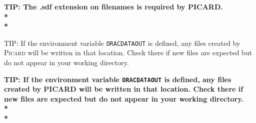 \documentclass[twoside,11pt]{article}
\newenvironment{latexonly}{}{}
\renewcommand{\_}{\texttt{\symbol{95}}}
\newenvironment{fmpage}[1]{\begin{lrbox}{\fmbox}\begin{minipage}{#1}}{\end{minipage}\end{lrbox}\fbox{\usebox{\fmbox}}}
\newcommand{\envvar}[1]{\texttt{#1}}
\begin{document}
\begin{htmlonly}
\textbf{TIP: The .sdf extension on filenames is required by PICARD.\\*\\*}
\end{htmlonly}


\begin{latexonly}
\begin{center}
\begin{fmpage}{0.95\linewidth}
\vspace{0.1cm}
TIP: If the environment variable \envvar{ORAC\_DATA\_OUT} is defined, any files
created by \textsc{Picard} will be written in that location. Check there if new
files are expected but do not appear in your working directory.
\end{fmpage}
\end{center}
\end{latexonly}

\begin{htmlonly}
\textbf{TIP: If the environment variable \envvar{ORAC\_DATA\_OUT} is defined,
any files created by PICARD will be written in that location. Check
there if new files are expected but do not appear in your working
directory.\\*\\*}
\end{htmlonly}
\newpage
\end{document}
